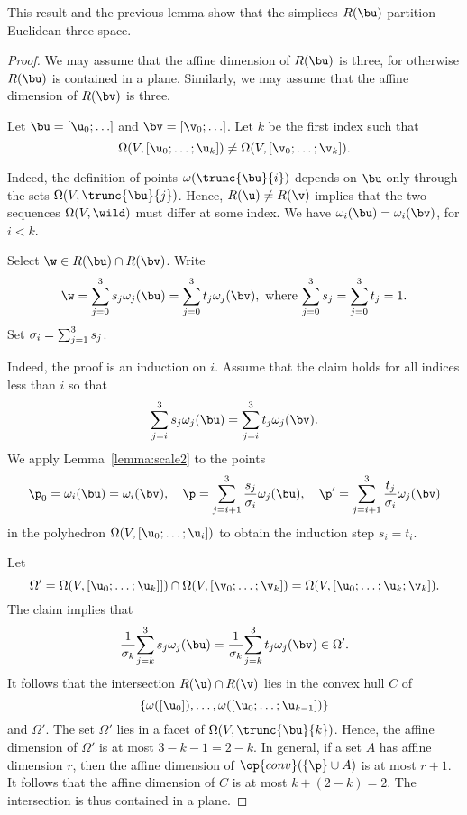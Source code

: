\begin{cnl}
This result and the previous lemma show that the simplices $R(\bu)$
partition Euclidean three-space.

\begin{proof} 
We may assume that the affine dimension of $R(\bu)$ 
is three, for otherwise $R(\bu)$ is contained in a plane.  Similarly,
we may assume that the affine dimension of $R(\bv)$ is
three.

Let $\bu = [\u_0;\ldots]$ and $\bv = [\v_0;\ldots]$.  
Let $k$ be the
first index such that
\[  
\Omega(V,\listdots{\u}{0}{k}) \ne \Omega(V,\listdots{\v}{0}{k}).
\] 

  Indeed, the definition of points
$\omega(\trunc{\bu}{i})$ depends on $\bu$ only through the sets
$\Omega(V,\trunc{\bu}{j})$.  Hence, $R(\u)\ne R(\v)$ implies that the
two sequences $\Omega(V,\wild )$ must differ at some index.
We have $\omega_i(\bu) = \omega_i(\bv)$, for $i<k$.

Select $\w\in R(\bu)\cap R(\bv)$.  Write
\[
\w = \sumupto{j}{0}{3}{s_j \omega_j(\bu)}  = \sumupto{j}{0}{3}{t_j \omega_j(\bv)},
\text{ where } \sumupto{j}{0}{3}{s_j} = \sumupto{j}{0}{3}{t_j} = 1.
\]
Set $\sigma_i = {\sum_{j = 1}^{3} {s_j}}$.

  Indeed, the
proof is an induction on $i$.  Assume that the claim holds for all
indices less than $i$ so that
\[
\sumupto{j}{i}{3}{s_j \omega_j(\bu)}  = \sumupto{j}{i}{3}{t_j \omega_j(\bv)}.
\]
We apply Lemma~\ref{lemma:scale2} to the points
\[
\p_0=\omega_i(\bu)=\omega_i(\bv),\quad
\p = \sumupto{j}{i+1}{3}{\frac{s_j}{\sigma_i} \omega_j(\bu)},\quad
\p' = \sumupto{j}{i+1}{3}{\frac{t_j}{\sigma_i} \omega_j(\bv)}
\]
in the polyhedron $\Omega(V,\listdots{\u}{0}{i})$
to obtain the induction step $s_i=t_i$.

Let
\[
\Omega'=\Omega(V,\listdots{\u}{0}{k}]) 
\cap \Omega(V,\listdots{\v}{0}{k})=
\Omega(V,[\u_0;\ldots;\u_{k};\v_{k}]).
\]
The claim implies that 
\[
\frac{1}{\sigma_k}\sumupto{j}{k}{3}{s_j \omega_j(\bu)} = 
\frac{1}{\sigma_k}\sumupto{j}{k}{3}{t_j \omega_j(\bv) \in\Omega'}.
\]
It follows that the intersection $R(\u)\cap R(\v)$ lies in the convex
hull $C$ of
\[
\{\omega([\u_0]),\ldots,\omega( [\u_0;\ldots; \u_{k-1}])\}
\]
and $\Omega'$.  The set $\Omega'$ lies in a facet of
$\Omega(V,\trunc{\bu}{k})$.  Hence, the affine dimension of $\Omega'$
is at most $3-k-1=2-k$.  In general, if a set $A$ has affine dimension
$r$, then the affine dimension of $\op{conv}(\braced{\p}\cup A)$ is at most
$r+1$.  It follows that the affine dimension of $C$ is at most 
$k + (2-k) = 2$.  The intersection is thus contained in a plane.
\end{proof}



\end{cnl}
